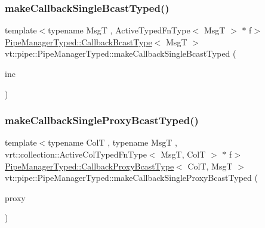 \mbox{\label{structvt_1_1pipe_1_1_pipe_manager_typed_a2ad082461a47d098fa5dadb7aca517e7}} 
\subsubsection{\texorpdfstring{make\+Callback\+Single\+Bcast\+Typed()}{makeCallbackSingleBcastTyped()}}
{\footnotesize\ttfamily template$<$typename MsgT , Active\+Typed\+Fn\+Type$<$ Msg\+T $>$ $\ast$ f$>$ \\
\hyperlink{structvt_1_1pipe_1_1_pipe_manager_typed_a4176395e8a35ec2a809890a9aad5b29e}{Pipe\+Manager\+Typed\+::\+Callback\+Bcast\+Type}$<$ MsgT $>$ vt\+::pipe\+::\+Pipe\+Manager\+Typed\+::make\+Callback\+Single\+Bcast\+Typed (\begin{DoxyParamCaption}\item[{bool const}]{inc }\end{DoxyParamCaption})}

\mbox{\label{structvt_1_1pipe_1_1_pipe_manager_typed_a4709469e02dda4bbe02cf5f5e18e36d6}} 
\subsubsection{\texorpdfstring{make\+Callback\+Single\+Proxy\+Bcast\+Typed()}{makeCallbackSingleProxyBcastTyped()}}
{\footnotesize\ttfamily template$<$typename ColT , typename MsgT , vrt\+::collection\+::\+Active\+Col\+Typed\+Fn\+Type$<$ Msg\+T, Col\+T $>$ $\ast$ f$>$ \\
\hyperlink{structvt_1_1pipe_1_1_pipe_manager_typed_a74e5f1a359ab32259f855998f867d93a}{Pipe\+Manager\+Typed\+::\+Callback\+Proxy\+Bcast\+Type}$<$ ColT, MsgT $>$ vt\+::pipe\+::\+Pipe\+Manager\+Typed\+::make\+Callback\+Single\+Proxy\+Bcast\+Typed (\begin{DoxyParamCaption}\item[{\hyperlink{namespacevt_a0d58a693bfb96e0ce5d145692a1a1f98}{Collection\+Proxy}$<$ ColT, typename Col\+T\+::\+Index\+Type $>$}]{proxy }\end{DoxyParamCaption})}

